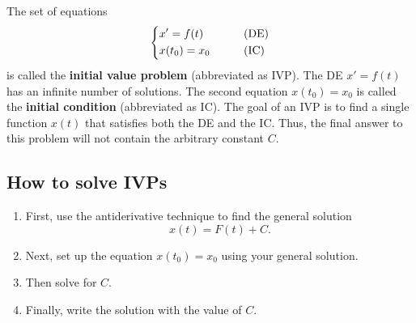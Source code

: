 \documentclass[11pt,letterpaper]{article}
\begin{document}
The set of equations 
\[
\begin{dcases}
    x' = f(t) &\qquad \text{(DE)}\\
    x(t_0) = x_0 &\qquad \text{(IC)}
\end{dcases}
\]
is called the \textbf{initial value problem} (abbreviated as IVP). 
The DE $x'=f(t)$ has an infinite number of solutions. The second equation 
$
x(t_0)=x_0
$
is called the \textbf{initial condition} (abbreviated as IC). The goal of an IVP is to find a single function $x(t)$ that satisfies both the DE and the IC.
Thus, the final answer to this problem will not contain the arbitrary constant $C$.

\subsection{How to solve IVPs}
\begin{enumerate}
    \item First, use the antiderivative technique to find the general solution 
\[
x(t) = F(t) +C.
\]
    \item Next, set up the equation $x(t_0)=x_0$ using your general solution. 
    \item Then solve for $C$. 
    \item Finally, write the solution with the value of $C$.
\end{enumerate}
\end{document}
